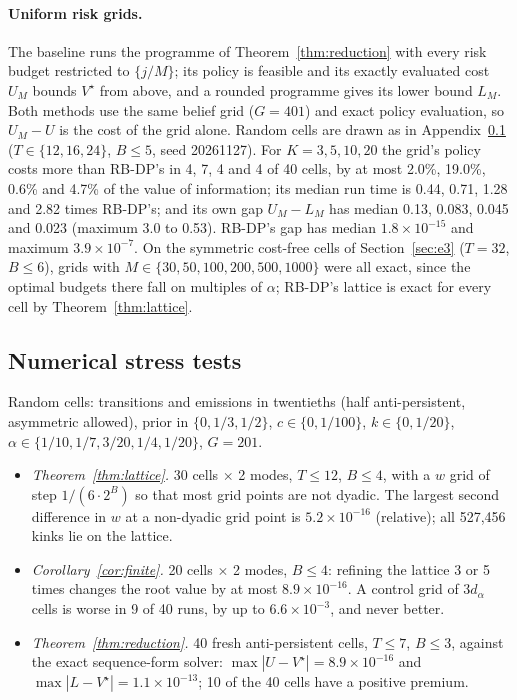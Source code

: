 \documentclass{article}
\theoremstyle{plain}
\theoremstyle{definition}
\theoremstyle{remark}
\begin{document}
\paragraph{Uniform risk grids.}
\label{app:grid}
The baseline runs the programme of Theorem~\ref{thm:reduction} with every risk budget restricted to $\{j/M\}$; its policy is feasible and its exactly evaluated cost $U_M$ bounds $V^\star$ from above, and a rounded programme gives its lower bound $L_M$. Both methods use the same belief grid ($G=401$) and exact policy evaluation, so $U_M-U$ is the cost of the grid alone. Random cells are drawn as in Appendix~\ref{app:stress} ($T\in\{12,16,24\}$, $B\le5$, seed 20261127). For $K=3,5,10,20$ the grid's policy costs more than RB-DP's in 4, 7, 4 and 4 of 40 cells, by at most 2.0\%, 19.0\%, 0.6\% and 4.7\% of the value of information; its median run time is 0.44, 0.71, 1.28 and 2.82 times RB-DP's; and its own gap $U_M-L_M$ has median 0.13, 0.083, 0.045 and 0.023 (maximum 3.0 to 0.53). RB-DP's gap has median $1.8\times10^{-15}$ and maximum $3.9\times10^{-7}$. On the symmetric cost-free cells of Section~\ref{sec:e3} ($T=32$, $B\le6$), grids with $M\in\{30,50,100,200,500,1000\}$ were all exact, since the optimal budgets there fall on multiples of $\alpha$; RB-DP's lattice is exact for every cell by Theorem~\ref{thm:lattice}.

\subsection{Numerical stress tests}
\label{app:stress}

Random cells: transitions and emissions in twentieths (half anti-persistent, asymmetric allowed), prior in $\{0,1/3,1/2\}$, $c\in\{0,1/100\}$, $k\in\{0,1/20\}$, $\alpha\in\{1/10,1/7,3/20,1/4,1/20\}$, $G=201$.
\begin{itemize}
\item \emph{Theorem~\ref{thm:lattice}.} 30 cells $\times$ 2 modes, $T\le12$, $B\le4$, with a $w$ grid of step $1/(6\cdot2^B)$ so that most grid points are not dyadic. The largest second difference in $w$ at a non-dyadic grid point is $5.2\times10^{-16}$ (relative); all 527{,}456 kinks lie on the lattice.
\item \emph{Corollary~\ref{cor:finite}.} 20 cells $\times$ 2 modes, $B\le4$: refining the lattice 3 or 5 times changes the root value by at most $8.9\times10^{-16}$. A control grid of $3d_\alpha$ cells is worse in 9 of 40 runs, by up to $6.6\times10^{-3}$, and never better.
\item \emph{Theorem~\ref{thm:reduction}.} 40 fresh anti-persistent cells, $T\le7$, $B\le3$, against the exact sequence-form solver: $\max|U-V^\star|=8.9\times10^{-16}$ and $\max|L-V^\star|=1.1\times10^{-13}$; 10 of the 40 cells have a positive premium.
\end{itemize}
\end{document}
